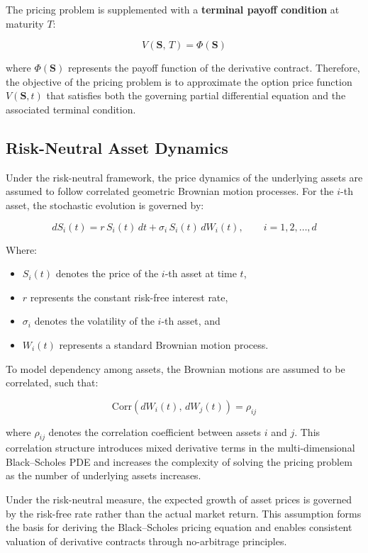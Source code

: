 \documentclass[12pt, a4paper]{article}
\begin{document}
The pricing problem is supplemented with a \textbf{terminal payoff
condition} at maturity $T$:

\[
    V(\mathbf{S},\, T) = \Phi(\mathbf{S})
\]

where $\Phi(\mathbf{S})$ represents the payoff function of the
derivative contract. Therefore, the objective of the pricing problem is
to approximate the option price function $V(\mathbf{S},t)$ that
satisfies both the governing partial differential equation and the
associated terminal condition.

\subsection{Risk-Neutral Asset Dynamics}

Under the risk-neutral framework, the price dynamics of the underlying
assets are assumed to follow correlated geometric Brownian motion
processes. For the $i$-th asset, the stochastic evolution is governed
by:

\begin{equation}
    dS_i(t) = r\, S_i(t)\, dt + \sigma_i\, S_i(t)\, dW_i(t),
    \qquad i = 1, 2, \ldots, d
    \label{eq:gbm}
\end{equation}

Where:
\begin{itemize}
    \item $S_i(t)$ denotes the price of the $i$-th asset at time $t$,
    \item $r$ represents the constant risk-free interest rate,
    \item $\sigma_i$ denotes the volatility of the $i$-th asset, and
    \item $W_i(t)$ represents a standard Brownian motion process.
\end{itemize}

To model dependency among assets, the Brownian motions are assumed to
be correlated, such that:

\[
    \mathrm{Corr}\!\left(dW_i(t),\, dW_j(t)\right) = \rho_{ij}
\]

where $\rho_{ij}$ denotes the correlation coefficient between assets
$i$ and $j$. This correlation structure introduces mixed derivative
terms in the multi-dimensional Black--Scholes PDE and increases the
complexity of solving the pricing problem as the number of underlying
assets increases.

Under the risk-neutral measure, the expected growth of asset prices is
governed by the risk-free rate rather than the actual market return.
This assumption forms the basis for deriving the Black--Scholes pricing
equation and enables consistent valuation of derivative contracts
through no-arbitrage principles.
\end{document}
